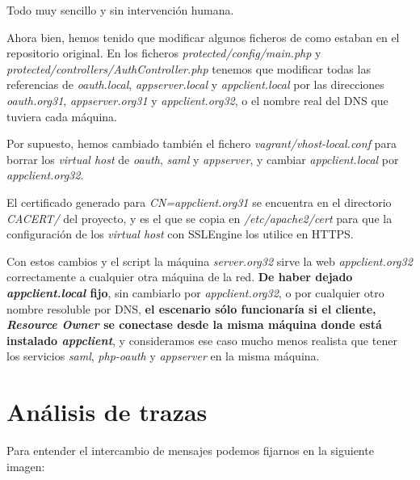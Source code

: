 \documentclass[]{article}
\begin{document}
Todo muy sencillo y sin intervención humana.


\hfill


Ahora bien, hemos tenido que modificar algunos ficheros de como estaban en el repositorio original. En los ficheros \textit{protected/config/main.php} y \textit{protected/controllers/AuthController.php} tenemos que modificar todas las referencias de \textit{oauth.local}, \textit{appserver.local} y \textit{appclient.local} por las direcciones \textit{oauth.org31}, \textit{appserver.org31} y \textit{appclient.org32}, o el nombre real del DNS que tuviera cada máquina.

Por supuesto, hemos cambiado también el fichero \textit{vagrant/vhost-local.conf} para borrar los \textit{virtual host} de \textit{oauth}, \textit{saml} y \textit{appserver}, y cambiar \textit{appclient.local} por \textit{appclient.org32}.

\hfill

El certificado generado para \textit{CN=appclient.org31} se encuentra en el directorio \textit{CACERT/} del proyecto, y es el que se copia en \textit{/etc/apache2/cert} para que la configuración de los \textit{virtual host} con SSLEngine los utilice en HTTPS.



\hfill


Con estos cambios y el script la máquina \textit{server.org32} sirve la web \textit{appclient.org32} correctamente a cualquier otra máquina de la red. \textbf{De haber dejado \textit{appclient.local} fijo}, sin cambiarlo por \textit{appclient.org32}, o por cualquier otro nombre resoluble por DNS, \textbf{el escenario sólo funcionaría si el cliente, \textit{Resource Owner} se conectase desde la misma máquina donde está instalado \textit{appclient}}, y consideramos ese caso mucho menos realista que tener los servicios \textit{saml}, \textit{php-oauth} y \textit{appserver} en la misma máquina.



\section{Análisis de trazas}

Para entender el intercambio de mensajes podemos fijarnos en la siguiente imagen:
\end{document}
